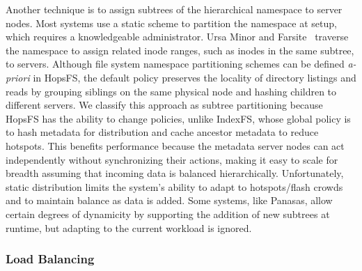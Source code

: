 Another technique is to assign subtrees of the hierarchical namespace to server
nodes. Most systems use a static scheme to partition the namespace at setup,
which requires a knowledgeable administrator. Ursa Minor and
Farsite~\cite{doucer:osdi2006-farsite-dir} traverse the namespace to assign
related inode ranges, such as inodes in the same subtree, to servers. Although
file system namespace partitioning schemes can be defined {\it a-priori} in
HopsFS, the default policy preserves the locality of directory listings and
reads by grouping siblings on the same physical node and hashing children to
different servers.  We classify this approach as subtree partitioning because
HopsFS has the ability to change policies, unlike IndexFS, whose global policy
is to hash metadata for distribution and cache ancestor metadata to reduce
hotspots.  This benefits performance because the metadata server nodes can act
independently without synchronizing their actions, making it easy to scale for
breadth assuming that incoming data is balanced hierarchically.  Unfortunately,
static distribution limits the system's ability to adapt to hotspots/flash
crowds and to maintain balance as data is added.  Some systems, like Panasas,
allow certain degrees of dynamicity by supporting the addition of new subtrees
at runtime, but adapting to the current workload is ignored.


\subsubsection{Load Balancing}


